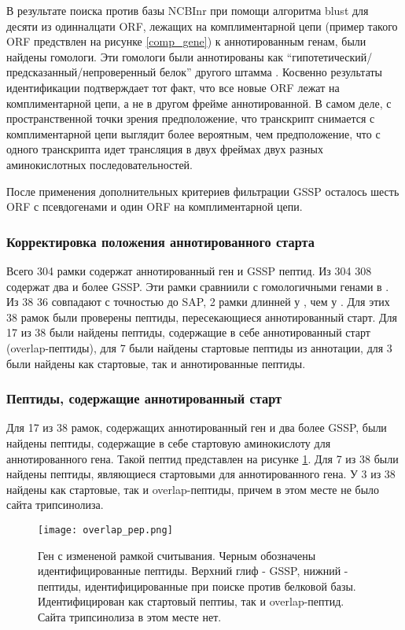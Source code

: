 В результате поиска против базы NCBInr при помощи алгоритма blust для десяти из одинналцати ORF, лежащих на комплиментарной цепи (пример такого ORF предствлен на рисунке \ref{comp_gene}) к аннотированным генам, были найдены гомологи. Эти гомологи были аннотированы как “гипотетический/предсказанный/непроверенный белок” другого штамма . Косвенно результаты идентификации подтверждает тот факт, что все новые ORF лежат на комплиментарной цепи, а не в другом фрейме аннотированной. В самом деле, с пространственной точки зрения предположение, что транскрипт снимается с комплиментарной цепи выглядит более вероятным, чем предположение, что с одного транскрипта идет трансляция в двух фреймах двух разных аминокислотных последовательностей.

После применения дополнительных критериев фильтрации GSSP осталось шесть ORF с псевдогенами и один ORF на комплиментарной цепи.

\subsubsection{Корректировка положения аннотированного старта}
Всего 304 рамки содержат аннотированный ген и GSSP пептид. Из 304 308 содержат два и более GSSP. Эти рамки сравниили с гомологичными генами в . Из 38 36 совпадают с точностью до SAP, 2 рамки длинней у , чем у . Для этих 38 рамок были проверены пептиды, пересекающиеся аннотированный старт. Для 17 из 38 были найдены пептиды, содержащие в себе аннотированный старт (overlap-пептиды), для 7 были найдены стартовые пептиды из аннотации, для 3 были найдены как стартовые, так и аннотированные пептиды.

\subsubsection{Пептиды, содержащие аннотированный старт}
Для 17 из 38 рамок, содержащих аннотированный ген и два более GSSP, были найдены пептиды, содержащие в себе стартовую аминокислоту для аннотированного гена. Такой пептид представлен на рисунке \ref{overlap_pep}. Для 7 из 38 были найдены пептиды, являющиеся стартовыми для аннотированного гена. У 3 из 38 найдены как стартовые, так и overlap-пептиды, причем в этом месте не было сайта трипсинолиза.

\begin{figure}[h!]
    \begin{center}
        \texttt{[image: overlap\_pep.png]}
    \end{center}
\caption[foo bar]{Ген с измененой рамкой считывания. Черным обозначены идентифицированные пептиды. Верхний глиф - GSSP, нижний - пептиды, идентифицированные при поиске против белковой базы. Идентифицирован как стартовый пептиы, так и overlap-пептид. Сайта трипсинолиза в этом месте нет. }
\label{overlap_pep}
\end{figure}



